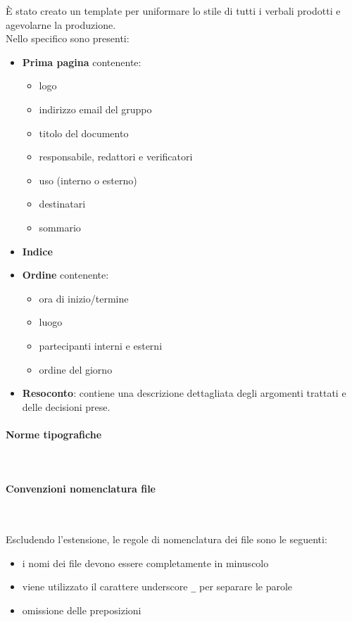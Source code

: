         È stato creato un template per uniformare lo stile di tutti i verbali prodotti e agevolarne la produzione.\\
        Nello specifico sono presenti:
        \begin{itemize}
            \item \textbf{Prima pagina} contenente:
            \begin {itemize} 
                \item logo
                \item indirizzo email del gruppo
                \item titolo del documento
                \item responsabile, redattori e verificatori
                \item uso (interno o esterno)
                \item destinatari
                \item sommario
            \end{itemize}
            \item \textbf{Indice}
            \item \textbf{Ordine} contenente:
            \begin {itemize} 
                \item ora di inizio/termine
                \item luogo
                \item partecipanti interni e esterni
                \item ordine del giorno
            \end{itemize}
            \item \textbf{Resoconto}: contiene una descrizione dettagliata degli argomenti trattati e delle decisioni prese.
        \end{itemize}

        \paragraph{Norme tipografiche} ~

        \paragraph{Convenzioni nomenclatura file} ~

        Escludendo l'estensione, le regole di nomenclatura dei file sono le seguenti:
            \begin{itemize}
                \item i nomi dei file devono essere completamente in minuscolo
                \item viene utilizzato il carattere underscore \texttt{\_} per separare le parole
                \item omissione delle preposizioni 
            \end{itemize}

